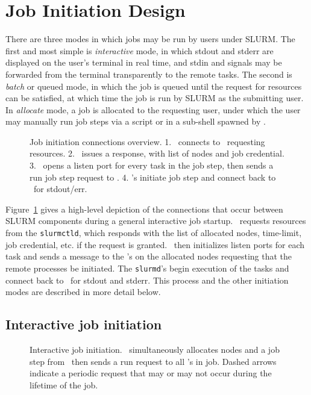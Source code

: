 \section{Job Initiation Design}

There are three modes in which jobs may be run by users under SLURM. The
first and most simple is {\em interactive} mode, in which stdout and
stderr are displayed on the user's terminal in real time, and stdin and
signals may be forwarded from the  terminal transparently to the remote
tasks. The second is {\em batch} or {queued} mode, in which the job is
queued until the request for resources can be satisfied, at which time the
job is run by SLURM as the submitting user. In {\em allocate} mode,
a job is allocated to the requesting user, under which the user may
manually run job steps via a script or in a sub-shell spawned by \srun .

\begin{figure}[tb]
\centerline{}
\caption{\small Job initiation connections overview. 1. \srun\ connects to 
         \slurmctld\ requesting resources. 2. \slurmctld\ issues a response,
	 with list of nodes and job credential. 3. \srun\ opens a listen
	 port for every task in the job step, then sends a run job step
	 request to \slurmd . 4. \slurmd 's initiate job step and connect
	 back to \srun\ for stdout/err. }
\label{connections}
\end{figure}

Figure~\ref{connections} gives a high-level depiction of the connections
that occur between SLURM components during a general interactive job
startup. \srun\ requests resources from the {\tt slurmctld}, which 
responds with the list of allocated nodes, time-limit, job credential, etc.
if the request is granted. \srun\ then initializes listen ports for each
task and sends a message to the \slurmd 's on the allocated nodes requesting
that the remote processes be initiated. The {\tt slurmd}'s begin execution of
the tasks and connect back to \srun\ for stdout and stderr. This process and
the other initiation modes are described in more detail below.

\subsection{Interactive job initiation}

\begin{figure}[tb]
\centerline{ }
\caption{\small Interactive job initiation. \srun\ simultaneously allocates
nodes
         and a job step from \slurmctld\ then sends a run request to all
	 \slurmd 's in job. Dashed arrows indicate a periodic request that
	 may or may not occur during the lifetime of the job.}
\label{init-interactive}
\end{figure}

